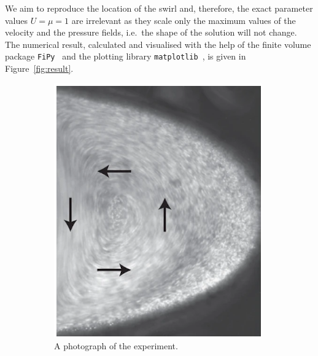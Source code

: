 \documentclass[11pt]{article}
\begin{document}
We aim to reproduce the location of the swirl and, therefore, the exact
parameter values $U=\mu=1$ are irrelevant as they scale only the maximum values
of the velocity and the pressure fields, i.e.~the shape of the solution will not
change.  The numerical result, calculated and visualised with the help of the
finite volume package \verb|FiPy|~\cite{FiPy2009} and the plotting library
\verb|matplotlib|~\cite{hunter2007matplotlib}, is given in
Figure~\ref{fig:result}.

\begin{figure}[htbp]
  \centering
  \begin{subfigure}[b]{0.3\textwidth}
    \centering
    \includegraphics[width=\textwidth]{./esimerkki_1.png}
    \caption{A photograph of the experiment. \cite{mayzel2019stokes}}
    \label{fig:photo}
  \end{subfigure}
  \hspace{2cm}
  \begin{subfigure}[b]{0.3\textwidth}
    \centering

\end{subfigure}
\end{figure}
\end{document}
